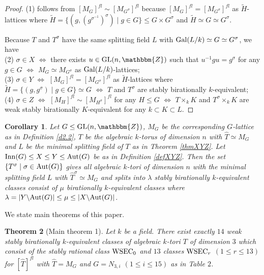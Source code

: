 \documentclass{amsart}
\theoremstyle{plain}
\newtheorem{theorem}{Theorem}[section]
\newtheorem{corollary}[theorem]{Corollary}
\theoremstyle{definition}
\theoremstyle{remark}
\newcommand{\bZ}{\mathbbm{Z}}\newcommand{\bQ}{\mathbbm{Q}}
\newcounter{sub}\def\tr{\mbox{tr }}
\begin{document}
\begin{proof}
(1) follows from 
$[M_G]^{fl}\sim [M_{G^\sigma}]^{fl}$ 
because 
$[M_G]^{fl}=[M_{G^\sigma}]^{fl}$ 
as $\widetilde{H}$-lattices where 
$\widetilde{H}=\{(g,(g^{\sigma^{-1}})^{\sigma})\mid 
g\in G\}\leq G\times G^\sigma$ and $\widetilde{H}\simeq G\simeq G^\sigma$. 

Because $T$ and $T^\sigma$ have the same splitting field $L$ 
with ${\rm Gal}(L/k)\simeq G\simeq G^\sigma$, 
we have\\
(2) $\sigma\in X$
$\Leftrightarrow$ 
there exists $u\in {\rm GL}(n,\bZ)$ such that 
$u^{-1}gu=g^\sigma$ for any $g\in G$ 
$\Leftrightarrow$ 
$M_G\simeq M_{G^\sigma}$ as ${\rm Gal}(L/k)$-lattices;\\
(3) 
$\sigma\in Y$
$\Leftrightarrow$ 
$[M_G]^{fl}=[M_{G^\sigma}]^{fl}$ as 
$\widetilde{H}$-lattices where 
$\widetilde{H}=\{(g,g^\sigma)\mid g\in G\}\simeq G$ 
$\Leftrightarrow$ 
$T$ and $T^\sigma$ are stably birationally $k$-equivalent;\\
(4) 
$\sigma\in Z$
$\Leftrightarrow$ 
$[M_H]^{fl}\sim [M_{H^\sigma}]^{fl}$ for any 
$H\leq G$ 
$\Leftrightarrow$ 
$T\times_k K$ and $T^\sigma\times_k K$ 
are weak stably birationally $K$-equivalent 
for any $k\subset K\subset L$. 
\end{proof}
%
\begin{corollary}
Let $G\leq {\rm GL}(n,\bZ)$, $M_G$ be the corresponding $G$-lattice as in Definition \ref{d2.2}, 
$T$ be the algebraic $k$-torus of dimension $n$ with $\widehat{T}\simeq M_G$ 
and $L$ be the minimal splitting field of $T$ as in Theorem \ref{thmXYZ}. 
Let ${\rm Inn}(G)\leq X\leq Y\leq {\rm Aut}(G)$ 
be as in Definition \ref{defXYZ}. 
Then the set $\{T^\sigma\mid \sigma\in {\rm Aut}(G)\}$ 
gives all algebraic $k$-tori of dimension $n$ 
with the minimal splitting field $L$ %
with $\widehat{T}^\sigma\simeq M_G$ 
and 
splits into $\lambda$ stably birationally $k$-equivalent classes consist of 
$\mu$ birationally $k$-equivalent classes where 
$\lambda=|Y\backslash {\rm Aut}(G)|\leq \mu\leq |X\backslash {\rm Aut}(G)|$.
\end{corollary}

We state main theorems of this paper.

\begin{theorem}[Main theorem 1]\label{thmain1}
Let $k$ be a field. 
There exist exactly $14$ weak stably birationally 
$k$-equivalent classes 
of algebraic $k$-tori $T$ of dimension $3$ which consist of 
the stably rational class ${\rm WSEC}_0$ 
and $13$ classes ${\rm WSEC}_r$ $(1\leq r\leq 13)$ 
for $[\widehat{T}]^{fl}$ with $\widehat{T}=M_G$ and 
$G=N_{3,i}$ $(1\leq i\leq 15)$ as in {\rm Table} $2$. 
\end{theorem}
\end{document}
